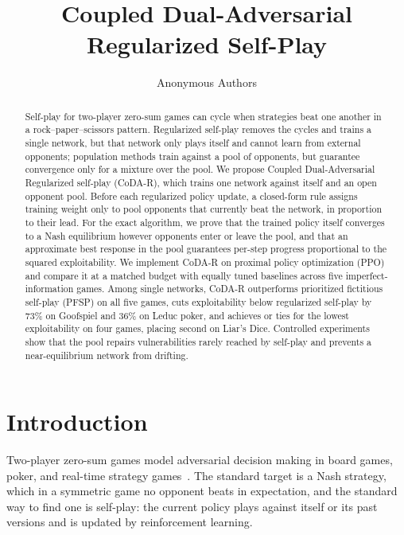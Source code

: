 \documentclass{article} %
\title{Coupled Dual-Adversarial Regularized Self-Play}
\author{Anonymous Authors}
\theoremstyle{plain}
\theoremstyle{remark}
\begin{document}
\maketitle

\begin{abstract}
Self-play for two-player zero-sum games can cycle when strategies beat one another in a rock--paper--scissors pattern. Regularized self-play removes the cycles and trains a single network, but that network only plays itself and cannot learn from external opponents; population methods train against a pool of opponents, but guarantee convergence only for a mixture over the pool. We propose Coupled Dual-Adversarial Regularized self-play (CoDA-R), which trains one network against itself and an open opponent pool. Before each regularized policy update, a closed-form rule assigns training weight only to pool opponents that currently beat the network, in proportion to their lead. For the exact algorithm, we prove that the trained policy itself converges to a Nash equilibrium however opponents enter or leave the pool, and that an approximate best response in the pool guarantees per-step progress proportional to the squared exploitability. We implement CoDA-R on proximal policy optimization (PPO) and compare it at a matched budget with equally tuned baselines across five imperfect-information games. Among single networks, CoDA-R outperforms prioritized fictitious self-play (PFSP) on all five games, cuts exploitability below regularized self-play by 73\% on Goofspiel and 36\% on Leduc poker, and achieves or ties for the lowest exploitability on four games, placing second on Liar's Dice. Controlled experiments show that the pool repairs vulnerabilities rarely reached by self-play and prevents a near-equilibrium network from drifting.
\end{abstract}

\section{Introduction}

Two-player zero-sum games model adversarial decision making in board games, poker, and real-time strategy games~\citep{silver2018alphazero,brown2018libratus,vinyals2019alphastar,perolat2022stratego}. The standard target is a Nash strategy, which in a symmetric game no opponent beats in expectation, and the standard way to find one is self-play: the current policy plays against itself or its past versions and is updated by reinforcement learning.
\end{document}
